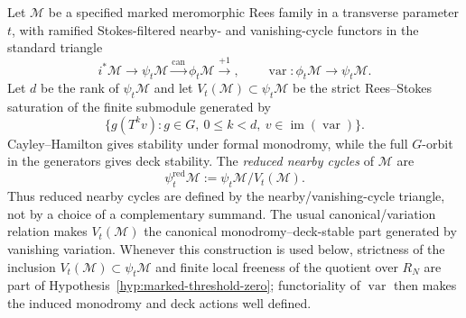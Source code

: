 \begin{definition}
\label{def:reduced-nearby}
Let \(\mathcal M\) be a specified marked meromorphic Rees family in a
transverse parameter \(t\), with ramified Stokes-filtered nearby- and
vanishing-cycle functors in the standard triangle
\[
 i^*\mathcal M\longrightarrow\psi_t\mathcal M
 \xrightarrow{\operatorname{can}}\phi_t\mathcal M
 \xrightarrow{+1},
 \qquad
 \operatorname{var}:\phi_t\mathcal M\longrightarrow\psi_t\mathcal M.
\]
Let \(d\) be the rank of \(\psi_t\mathcal M\) and let
\(V_t(\mathcal M)\subset\psi_t\mathcal M\) be the strict
Rees--Stokes saturation of the
finite submodule generated by
\[
 \{g(T^k v):g\in G,\ 0\leq k<d,\
   v\in\operatorname{im}(\operatorname{var})\}.
\]
Cayley--Hamilton gives stability under formal monodromy, while the full
\(G\)-orbit in the generators gives deck stability.
The \emph{reduced nearby cycles} of \(\mathcal M\) are
\[
 \psi_t^{\mathrm{red}}\mathcal M
 :=\psi_t\mathcal M/V_t(\mathcal M).
\]
Thus reduced nearby cycles are defined by the nearby/vanishing-cycle triangle,
not by a choice of a complementary summand.  The usual
canonical/variation relation makes \(V_t(\mathcal M)\) the canonical
monodromy--deck-stable part generated by vanishing variation.  Whenever this
construction is used below, strictness of the inclusion
\(V_t(\mathcal M)\subset\psi_t\mathcal M\) and finite local freeness of the
quotient over \(R_N\) are part of
Hypothesis~\ref{hyp:marked-threshold-zero}; functoriality of
\(\operatorname{var}\) then makes the induced monodromy and deck actions
well defined.
\end{definition}

